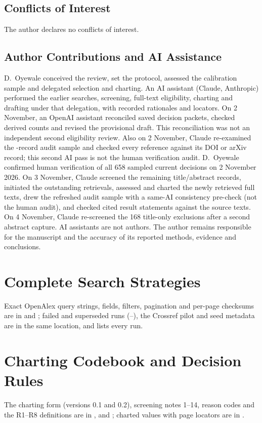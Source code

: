 \documentclass[journal]{IEEEtran}
\begin{document}
\subsection*{Conflicts of Interest}
The author declares no conflicts of interest.
\subsection*{Author Contributions and AI Assistance}
D.~Oyewale conceived the review, set the protocol, assessed the calibration sample and delegated selection and charting. An AI assistant (Claude, Anthropic) performed the earlier searches, screening, full-text eligibility, charting and drafting under that delegation, with recorded rationales and locators. On 2 November, an OpenAI assistant reconciled saved decision packets, checked derived counts and revised the provisional draft. This reconciliation was not an independent second eligibility review. Also on 2 November, Claude re-examined the \nAuditRows{}-record audit sample and checked every reference against its DOI or arXiv record; this second AI pass is not the human verification audit. D.~Oyewale confirmed human verification of all 658 sampled current decisions on 2 November 2026. On 3 November, Claude screened the remaining title/abstract records, initiated the outstanding retrievals, assessed and charted the newly retrieved full texts, drew the refreshed audit sample with a same-AI consistency pre-check (not the human audit), and checked cited result statements against the source texts. On 4 November, Claude re-screened the 168 title-only exclusions after a second abstract capture. AI assistants are not authors. The author remains responsible for the manuscript and the accuracy of its reported methods, evidence and conclusions.

\appendices
\section{Complete Search Strategies}
\label{app:search}
Exact OpenAlex query strings, fields, filters, pagination and per-page checksums are in  and ; failed and superseded runs (--), the Crossref pilot and seed metadata are in the same location, and  lists every run.

\section{Charting Codebook and Decision Rules}
\label{app:codebook}
The charting form (versions 0.1 and 0.2), screening notes 1--14, reason codes and the R1--R8 definitions are in ,  and ; charted values with page locators are in .
\end{document}
